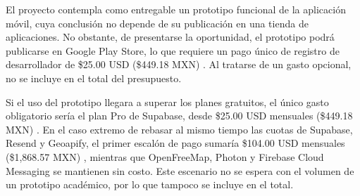 El proyecto contempla como entregable un prototipo funcional de la aplicación móvil, cuya conclusión no depende de su publicación en una tienda de aplicaciones. No obstante, de presentarse la oportunidad, el prototipo podrá publicarse en Google Play Store, lo que requiere un pago único de registro de desarrollador de \$25.00 USD (\$449.18 MXN) \cite{google_play_console}. Al tratarse de un gasto opcional, no se incluye en el total del presupuesto.

Si el uso del prototipo llegara a superar los planes gratuitos, el único gasto obligatorio sería el plan Pro de Supabase, desde \$25.00 USD mensuales (\$449.18 MXN) \cite{supabase_pricing}. En el caso extremo de rebasar al mismo tiempo las cuotas de Supabase, Resend y Geoapify, el primer escalón de pago sumaría \$104.00 USD mensuales (\$1,868.57 MXN) \cite{supabase_pricing,resend_pricing,geoapify_pricing}, mientras que OpenFreeMap, Photon y Firebase Cloud Messaging se mantienen sin costo. Este escenario no se espera con el volumen de un prototipo académico, por lo que tampoco se incluye en el total.

